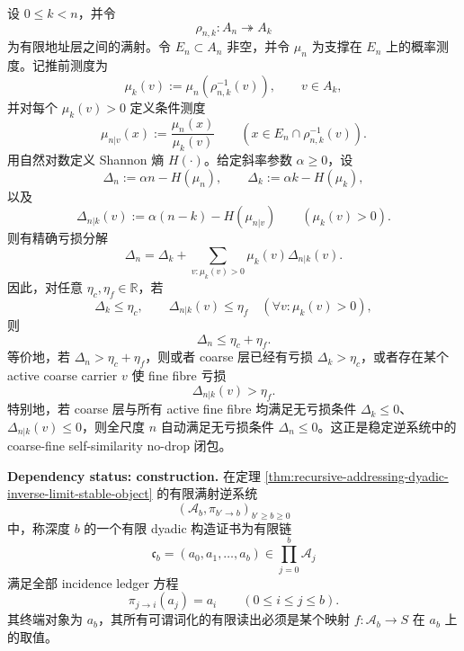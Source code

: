 \begin{theorem}\label{distill:wang_zahl-sticky_reduction_and_scale_saturated_closure-scale-saturated-entropy-deficit-identity}
设 \(0\le k<n\)，并令
\[
\rho_{n,k}:A_n\twoheadrightarrow A_k
\]
为有限地址层之间的满射。令 \(E_n\subset A_n\) 非空，并令 \(\mu_n\) 为支撑在 \(E_n\) 上的概率测度。记推前测度为
\[
\mu_k(v):=\mu_n(\rho_{n,k}^{-1}(v)),
\qquad v\in A_k,
\]
并对每个 \(\mu_k(v)>0\) 定义条件测度
\[
\mu_{n|v}(x):=\frac{\mu_n(x)}{\mu_k(v)}
\qquad
(x\in E_n\cap\rho_{n,k}^{-1}(v)).
\]
用自然对数定义 Shannon 熵 \(H(\cdot)\)。给定斜率参数 \(\alpha\ge0\)，设
\[
\Delta_n:=\alpha n-H(\mu_n),
\qquad
\Delta_k:=\alpha k-H(\mu_k),
\]
以及
\[
\Delta_{n|k}(v):=\alpha(n-k)-H(\mu_{n|v})
\qquad(\mu_k(v)>0).
\]
则有精确亏损分解
\[
\boxed{\;
\Delta_n=\Delta_k+\sum_{v:\mu_k(v)>0}\mu_k(v)\Delta_{n|k}(v).
\;}
\]
因此，对任意 \(\eta_c,\eta_f\in\mathbb R\)，若
\[
\Delta_k\le\eta_c,
\qquad
\Delta_{n|k}(v)\le\eta_f\quad(\forall v:\mu_k(v)>0),
\]
则
\[
\Delta_n\le\eta_c+\eta_f.
\]
等价地，若 \(\Delta_n>\eta_c+\eta_f\)，则或者 coarse 层已经有亏损 \(\Delta_k>\eta_c\)，或者存在某个 active coarse carrier \(v\) 使 fine fibre 亏损
\[
\Delta_{n|k}(v)>\eta_f.
\]
特别地，若 coarse 层与所有 active fine fibre 均满足无亏损条件 \(\Delta_k\le0\)、\(\Delta_{n|k}(v)\le0\)，则全尺度 \(n\) 自动满足无亏损条件 \(\Delta_n\le0\)。这正是稳定逆系统中的 coarse-fine self-similarity no-drop 闭包。
\end{theorem}

\begin{definition}\label{def:distill-euclid-elements-dyadic-construction-certificate}
\textbf{Dependency status: construction.}
在定理 \ref{thm:recursive-addressing-dyadic-inverse-limit-stable-object} 的有限满射逆系统
\[
(\mathcal A_b,\pi_{b'\to b})_{b'\ge b\ge0}
\]
中，称深度 \(b\) 的一个有限 dyadic 构造证书为有限链
\[
\mathfrak c_b=(a_0,a_1,\ldots,a_b)\in\prod_{j=0}^b\mathcal A_j
\]
满足全部 incidence ledger 方程
\[
\pi_{j\to i}(a_j)=a_i
\qquad(0\le i\le j\le b).
\]
其终端对象为 \(a_b\)，其所有可谓词化的有限读出必须是某个映射 \(f:\mathcal A_b\to S\) 在 \(a_b\) 上的取值。
\end{definition}

